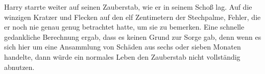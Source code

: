 Harry starrte weiter auf seinen Zauberstab, wie er in seinem Schoß lag. Auf die winzigen Kratzer und Flecken auf den elf Zentimetern der Stechpalme, Fehler, die er noch nie genau genug betrachtet hatte, um sie zu bemerken. Eine schnelle gedankliche Berechnung ergab, dass es keinen Grund zur Sorge gab, denn wenn es sich hier um eine Ansammlung von Schäden aus sechs oder sieben Monaten handelte, dann würde ein normales Leben den Zauberstab nicht vollständig abnutzen.
